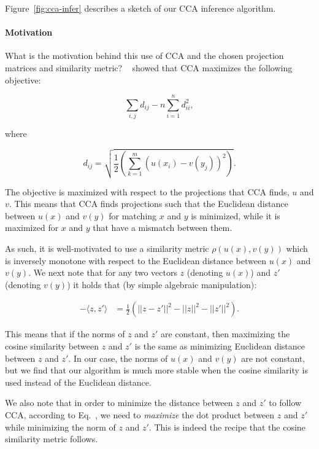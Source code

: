 \documentclass[letterpaper]{article}
\newcommand{\newcite}[1]{\citeauthor{#1}~\shortcite{#1}}
\begin{document}
Figure~\ref{fig:cca-infer} describes a sketch of our CCA inference algorithm.

\paragraph{Motivation} What is the motivation behind this use of CCA and the chosen projection matrices and similarity
metric? \newcite{osborne-16} showed that CCA maximizes the following objective:

\begin{equation}
\sum_{i,j} d_{ij} - n \sum_{i=1}^n d_{ii}^2,
\end{equation}

\noindent where

\begin{equation}
d_{ij} = \sqrt{\displaystyle\frac{1}{2} \left( \sum_{k=1}^m (u(x_i) - v(y_j))^2 \right)}.
\end{equation}

The objective is maximized with respect to the projections that CCA finds, $u$ and $v$.
This means that CCA finds projections such that the Euclidean distance between
$u(x)$ and $v(y)$ for matching $x$ and $y$ is minimized, while it is maximized for $x$ and $y$
that have a mismatch between them.

As such, it is well-motivated to use a similarity metric $\rho(u(x),v(y))$ which is inversely monotone with
respect to the Euclidean distance between $u(x)$ and $v(y)$.  
We next note that for any two vectors $z$ (denoting $u(x)$) and $z'$ (denoting $v(y)$) it holds
that (by simple algebraic manipulation):

\begin{align} 
- \langle z, z' \rangle & = \frac{1}{2} \left( || z - z'||^2 - || z||^2 - ||z'||^2 \right). \label{eq:aa}
\end{align}

This means that if the norms of $z$ and $z'$ are constant, then maximizing the cosine similarity
between $z$ and $z'$ is the same as minimizing Euclidean distance between $z$ and $z'$.
In our case, the norms of $u(x)$ and $v(y)$ are not constant, but we find that our algorithm is
much more stable when the cosine similarity is used instead of the Euclidean distance.

We also note that in order to minimize the distance between $z$ and $z'$ to follow CCA, according
to Eq.~, we need to {\em maximize} the dot product between $z$ and $z'$ while minimizing
the norm of $z$ and $z'$. This is indeed the recipe that the cosine similarity metric follows.
\end{document}
